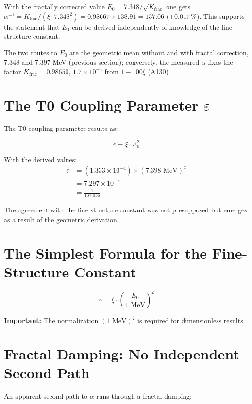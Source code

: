 	With the fractally corrected value $E_0 = 7.348/\sqrt{K_{\text{frac}}}$ one gets $\alpha^{-1} = K_{\text{frac}}/(\xi \cdot 7.348^2) = 0.98667 \times 138.91 = 137.06$ ($+0.017\,\%$). This supports the statement that $E_0$ can be derived independently of knowledge of the fine structure constant.
	
	The two routes to $E_0$ are the geometric mean without and with fractal correction, $7.348$ and $7.397$ MeV (previous section); conversely, the measured $\alpha$ fixes the factor $K_{\text{frac}} = 0.98650$, $1.7\times10^{-4}$ from $1 - 100\xi$ (A130).
	
	\section{The T0 Coupling Parameter $\varepsilon$}
	
	The T0 coupling parameter results as:
	
	\begin{equation}
		\varepsilon = \xi \cdot E_0^2
	\end{equation}
	
	With the derived values:
	\begin{align}
		\varepsilon &= (1.333 \times 10^{-4}) \times (7.398 \text{ MeV})^2\\
		&= 7.297 \times 10^{-3}\\
		&= \frac{1}{137.036}
	\end{align}
	
	The agreement with the fine structure constant was not presupposed but emerges as a result of the geometric derivation.
\section*{The Simplest Formula for the Fine-Structure Constant}

\[
\boxed{\alpha = \xi \cdot \left(\frac{E_0}{1 \text{ MeV}}\right)^2}
\]
\begin{tcolorbox}[colback=red!5!white,colframe=red!75!black]
	\textbf{Important:} The normalization $(1 \text{ MeV})^2$ is required for dimensionless results.
\end{tcolorbox}	
	\section{Fractal Damping: No Independent Second Path}
	
	An apparent second path to $\alpha$ runs through a fractal damping:
	
